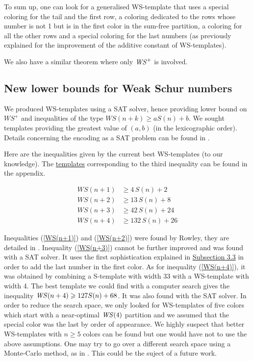 \par
To sum up, one can look for a generalised WS-template that uses a special coloring for the tail and the first row, a
coloring dedicated to the rows whose number is not 1 but is in the first color in the sum-free partition, a coloring for all
the other rows and a special coloring for the last numbers (as previously explained for the improvement of the additive
constant of WS-templates).

We also have a similar theorem where only \(\mathit{WS}^+\) is involved.


\subsection{New lower bounds for Weak Schur numbers}

\qquad We produced WS-templates using a SAT solver, hence providing lower bound on \(WS^+\) and inequalities
of the type \(WS(n+k) \geqslant a S(n) + b\). We sought templates providing the greatest value of \((a, b)\) (in the 
lexicographic order). Details concerning the encoding as a SAT problem can be found in \cite{Heule2017}.

\par
Here are the inequalities given by the current best WS-templates (to our knowledge). The \hyperref[WS-templates]{templates} 
corresponding to the third inequality can be found in the appendix.

\begin{align}
	WS(n + 1) &\geqslant  4\,S(n)  +  2 \label{WS(n+1)} \\
	WS(n + 2) &\geqslant  13\,S(n)  +  8 \label{WS(n+2)} \\
	WS(n + 3) &\geqslant  42\,S(n)  +  24 \label{WS(n+3)} \\
	WS(n + 4) &\geqslant  132\,S(n)  +  26 \label{WS(n+4)}
\end{align}

Inequalities (\ref{WS(n+1)}) and (\ref{WS(n+2)}) were found by Rowley, they are detailed in \cite{RowleyWS}. 
Inequality (\ref{WS(n+3)}) cannot be further improved and was found with a SAT solver. It uses the first 
sophistication explained in \hyperref[ConstructionWS]{Subsection 3.3} in order to add
the last number in the first color. As for inequality (\ref{WS(n+4)}), it was obtained by combining a S-template with 
width 33 with a WS-template with width 4. The best template we could find with a computer search gives the 
inequality \(\mathit{WS}(n+4) \geqslant 127 S(n) + 68\). It was also found with the SAT solver. In order to reduce the search space, 
we only looked for WS-templates of five colors which start with a near-optimal \(\mathit{WS}(4)\) partition and we assumed that the 
special color was the last by order of appearance. We highly suspect that better WS-templates with \(n \geqslant 5\) 
colors can be found but one would have not to use the above assumptions. One may try to go over a different search space 
using a Monte-Carlo method, as in \cite{Bouzy2015AnAP}. This could be the suject of a future work.


